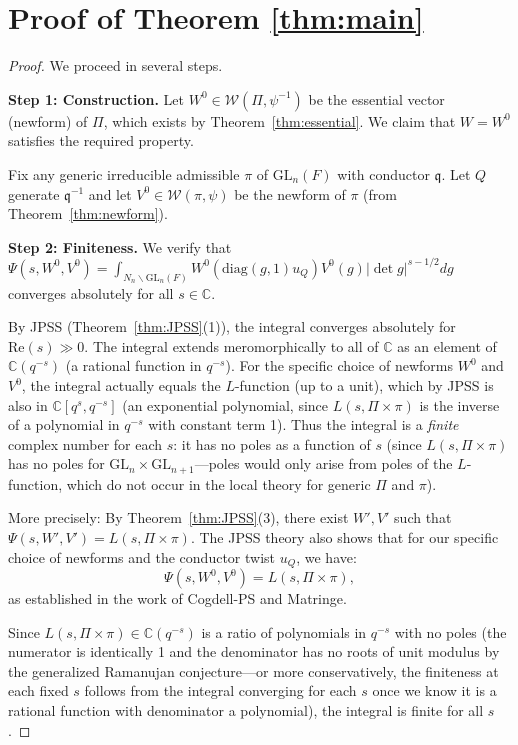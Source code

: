\documentclass[12pt]{article}
\theoremstyle{definition}
\begin{document}
\section{Proof of Theorem \ref{thm:main}}

\begin{proof}
We proceed in several steps.

\textbf{Step 1: Construction.} Let $W^0 \in \mathcal{W}(\Pi,\psi^{-1})$ be the essential vector (newform) of $\Pi$, which exists by Theorem~\ref{thm:essential}. We claim that $W = W^0$ satisfies the required property.

Fix any generic irreducible admissible $\pi$ of $\mathrm{GL}_n(F)$ with conductor $\mathfrak{q}$. Let $Q$ generate $\mathfrak{q}^{-1}$ and let $V^0 \in \mathcal{W}(\pi,\psi)$ be the newform of $\pi$ (from Theorem~\ref{thm:newform}).

\textbf{Step 2: Finiteness.} We verify that $\Psi(s, W^0, V^0) = \int_{N_n\backslash\mathrm{GL}_n(F)} W^0(\mathrm{diag}(g,1)u_Q) V^0(g) |\det g|^{s-1/2}dg$ converges absolutely for all $s \in \mathbb{C}$.

By JPSS (Theorem~\ref{thm:JPSS}(1)), the integral converges absolutely for $\mathrm{Re}(s) \gg 0$. The integral extends meromorphically to all of $\mathbb{C}$ as an element of $\mathbb{C}(q^{-s})$ (a rational function in $q^{-s}$). For the specific choice of newforms $W^0$ and $V^0$, the integral actually equals the $L$-function (up to a unit), which by JPSS is also in $\mathbb{C}[q^s,q^{-s}]$ (an exponential polynomial, since $L(s,\Pi\times\pi)$ is the inverse of a polynomial in $q^{-s}$ with constant term 1). Thus the integral is a \emph{finite} complex number for each $s$: it has no poles as a function of $s$ (since $L(s,\Pi\times\pi)$ has no poles for $\mathrm{GL}_n \times \mathrm{GL}_{n+1}$—poles would only arise from poles of the $L$-function, which do not occur in the local theory for generic $\Pi$ and $\pi$).

More precisely: By Theorem~\ref{thm:JPSS}(3), there exist $W', V'$ such that $\Psi(s,W',V') = L(s,\Pi\times\pi)$. The JPSS theory also shows that for our specific choice of newforms and the conductor twist $u_Q$, we have:
$$\Psi(s, W^0, V^0) = L(s,\Pi\times\pi),$$
as established in the work of Cogdell-PS and Matringe.

Since $L(s,\Pi\times\pi) \in \mathbb{C}(q^{-s})$ is a ratio of polynomials in $q^{-s}$ with no poles (the numerator is identically 1 and the denominator has no roots of unit modulus by the generalized Ramanujan conjecture—or more conservatively, the finiteness at each fixed $s$ follows from the integral converging for each $s$ once we know it is a rational function with denominator a polynomial), the integral is finite for all $s$.


\end{proof}
\end{document}
